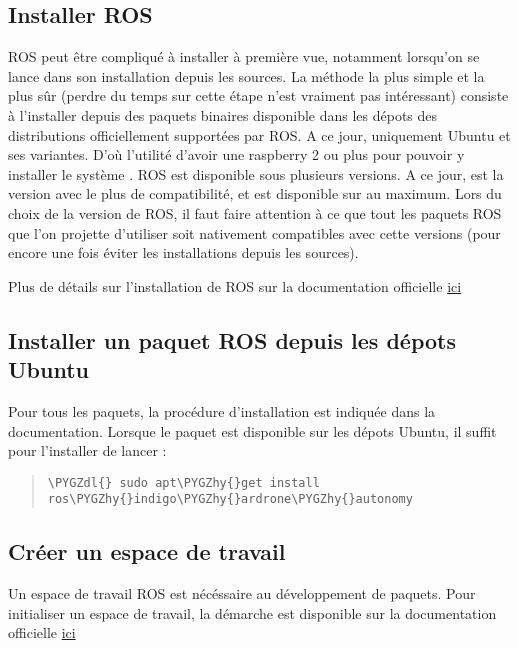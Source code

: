 \documentclass[letterpaper,10pt,french]{sphinxmanual}
\def\PYGZdl{\char`\$}
\def\PYGZhy{\char`\-}
\begin{document}
\subsection{Installer ROS}
\label{ros:installer-ros}
ROS peut être compliqué à installer à première vue, notamment lorsqu'on se lance dans son installation depuis les sources.
La méthode la plus simple et la plus sûr (perdre du temps sur cette étape n'est vraiment pas intéressant) consiste à
l'installer depuis des paquets binaires disponible dans les dépots des distributions officiellement supportées par ROS.
A ce jour, uniquement Ubuntu et ses variantes.
D'où l'utilité d'avoir une raspberry 2 ou plus pour pouvoir y installer le système .
ROS est disponible sous plusieurs versions. A ce jour,  est la version avec le plus de compatibilité, et
est disponible sur  au maximum. Lors du choix de la version de ROS, il faut faire attention à
ce que tout les paquets ROS que l'on projette d'utiliser soit nativement compatibles avec cette versions (pour encore
une fois éviter les installations depuis les sources).

Plus de détails sur l'installation de ROS sur la documentation officielle \href{http://wiki.ros.org/fr/ROS/Installation}{ici}


\subsection{Installer un paquet ROS depuis les dépots Ubuntu}
\label{ros:installer-un-paquet-ros-depuis-les-depots-ubuntu}
Pour tous les paquets, la procédure d'installation est indiquée dans la documentation. Lorsque le paquet est disponible
sur les dépots Ubuntu, il suffit pour l'installer de lancer :
\begin{quote}

\begin{Verbatim}[commandchars=\\\{\}]
\PYGZdl{} sudo apt\PYGZhy{}get install ros\PYGZhy{}indigo\PYGZhy{}ardrone\PYGZhy{}autonomy
\end{Verbatim}
\end{quote}


\subsection{Créer un espace de travail}
\label{ros:creer-un-espace-de-travail}
Un espace de travail ROS est nécéssaire au développement de paquets. Pour initialiser un espace de travail, la démarche
est disponible sur la documentation officielle \href{http://wiki.ros.org/catkin/Tutorials/create\_a\_workspace}{ici}
\end{document}
